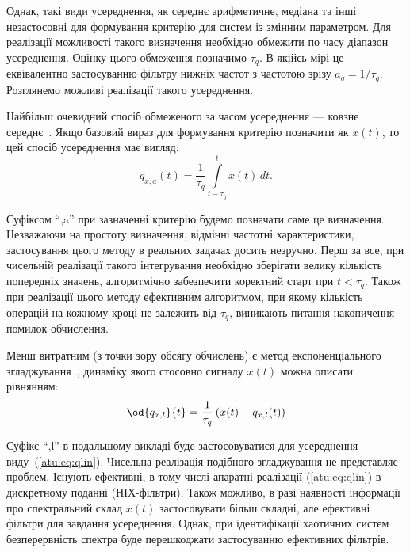 Однак, такі види усереднення, як середнє арифметичне, медіана та
інші незастосовні для формування критерію для систем із змінним
параметром. Для реалізації можливості такого визначення
необхідно обмежити по часу діапазон усереднення. Оцінку
цього обмеження позначимо
\label{atu:d:tau_q}$\tau_q$.
В якійсь мірі це еквівалентно застосуванню фільтру нижніх
частот з частотою зрізу
\label{atu:d:a_q}$a_q = 1 / \tau_q$.
Розглянемо можливі реалізації такого усереднення.

Найбільш очевидний спосіб обмеженого за часом усереднення ---
ковзне середнє~\cite{greshilov_mat_met_prognoz}.
Якщо базовий вираз для формування критерію позначити як
$x(t)$, то цей спосіб усереднення має вигляд:
%
\begin{equation}
  q_{x,a}(t) =
  \frac{1}{\tau_q}
  \int\limits_{t-\tau_q}^{t} x(t) \, dt.
  \label{atu:eq:moving_avarage}
\end{equation}

Суфіксом ``,a'' при зазначенні критерію будемо позначати саме це
визначення. Незважаючи на простоту визначення, відмінні частотні
характеристики, застосування цього методу в реальних задачах
досить незручно. Перш за все, при чисельній реалізації такого
інтегрування необхідно зберігати велику кількість попередніх
значень, алгоритмічно забезпечити коректний старт при
$ t <  \tau_q $. Також при реалізації цього методу ефективним алгоритмом,
при якому кількість операцій на кожному кроці не залежить від
$ \tau_q $, виникають питання накопичення помилок обчислення.

Менш витратним (з точки зору обсягу обчислень) є метод експоненціального
згладжування~\cite{rastr_stat_meth_search},
динаміку якого стосовно сигналу $x(t)$ можна описати
рівнянням:
%
\begin{equation}
\od{q_{x,l}}{t}
=
\frac{1}{\tau_q} \left( x(t) - q_{x,l}(t) \right)
\label{atu:eq:qlin}
\end{equation}

Суфікс ``,l'' в подальшому викладі буде застосовуватися для
усереднення виду~(\ref{atu:eq:qlin}). Чисельна реалізація подібного
згладжування не представляє проблем. Існують ефективні, в тому
числі апаратні реалізації (\ref{atu:eq:qlin}) в дискретному поданні
(НІХ-фільтри). Також можливо, в разі наявності інформації про
спектральний склад
$x(t)$ застосовувати більш складні, але ефективні фільтри для завдання
усереднення. Однак, при ідентифікації хаотичних систем
безперервність спектра буде перешкоджати застосуванню
ефективних фільтрів.


